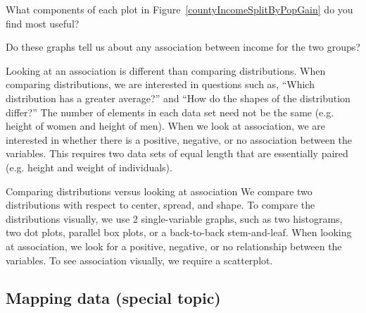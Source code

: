 \begin{exercisewrap}
\begin{nexercise}
What components of each plot in Figure~\ref{countyIncomeSplitByPopGain} do you find most useful?\footnotemark\end{nexercise}
\end{exercisewrap}

\begin{exercisewrap}
\begin{nexercise}
Do these graphs tell us about any association between income for the two groups?\footnotemark
\end{nexercise}
\end{exercisewrap}

Looking at an association is different than comparing distributions. When comparing distributions, we are interested in questions such as, ``Which distribution has a greater average?'' and ``How do the shapes of the distribution differ?'' The number of elements in each data set need not be the same (e.g. height of women and height of men). When we look at association, we are interested in whether there is a positive, negative, or no association between the variables. This requires two data sets of equal length that are essentially paired (e.g. height and weight of individuals).

\begin{onebox}{Comparing distributions versus looking at association}
We compare two distributions with respect to center, spread, and shape.  To compare the distributions visually, we use 2 single-variable graphs, such as two histograms, two dot plots, parallel box plots, or a back-to-back stem-and-leaf. When looking at association, we look for a positive, negative, or no relationship between the variables. To see association visually, we require a scatterplot.\end{onebox}




\subsection{Mapping data (special topic)}

